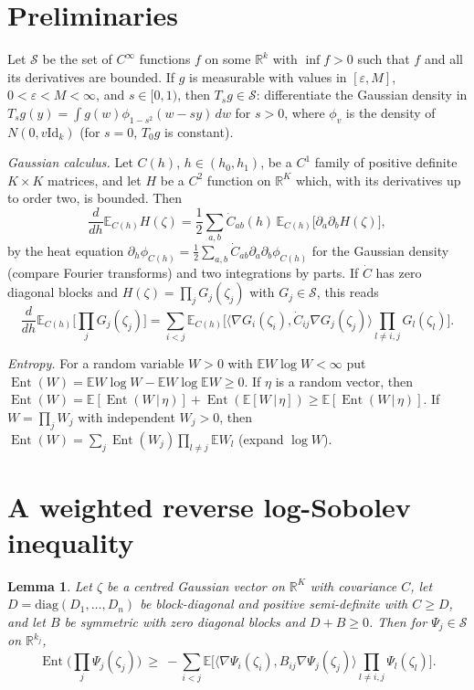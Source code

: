 \documentclass[11pt]{amsart}
\newtheorem{lemma}[theorem]{Lemma}
\theoremstyle{definition}
\newcommand{\E}{\mathbb{E}}
\newcommand{\R}{\mathbb{R}}
\newcommand{\Ent}{\operatorname{Ent}}
\newcommand{\cS}{\mathcal{S}}
\newcommand{\Id}{\mathrm{Id}}
\begin{document}
\section{Preliminaries}
Let $\cS$ be the set of $C^\infty$ functions $f$ on some $\R^k$ with $\inf f>0$ such that $f$ and all its derivatives
are bounded. If $g$ is measurable with values in $[\varepsilon,M]$, $0<\varepsilon<M<\infty$, and $s\in[0,1)$, then
$T_sg\in\cS$: differentiate the Gaussian density in $T_sg(y)=\int g(w)\phi_{1-s^2}(w-sy)\,dw$ for $s>0$, where
$\phi_v$ is the density of $N(0,v\Id_k)$ (for $s=0$, $T_0g$ is constant).

\emph{Gaussian calculus.} Let $C(h)$, $h\in(h_0,h_1)$, be a $C^1$ family of positive definite $K\times K$ matrices, and
let $H$ be a $C^2$ function on $\R^K$ which, with its derivatives up to order two, is bounded. Then
\begin{equation}\label{eq:interp}
\frac{d}{dh}\E_{C(h)}H(\zeta)=\frac12\sum_{a,b}\dot C_{ab}(h)\,\E_{C(h)}\big[\partial_a\partial_bH(\zeta)\big],
\end{equation}
by the heat equation $\partial_h\phi_{C(h)}=\frac12\sum_{a,b}\dot C_{ab}\partial_a\partial_b\phi_{C(h)}$ for the
Gaussian density (compare Fourier transforms) and two integrations by parts. If $\dot C$ has zero diagonal blocks and
$H(\zeta)=\prod_jG_j(\zeta_j)$ with $G_j\in\cS$, this reads
\begin{equation}\label{eq:drho}
\frac{d}{dh}\E_{C(h)}\Big[\prod_jG_j(\zeta_j)\Big]=\sum_{i<j}\E_{C(h)}\Big[\big\langle\nabla G_i(\zeta_i),
\dot C_{ij}\nabla G_j(\zeta_j)\big\rangle\prod_{l\ne i,j}G_l(\zeta_l)\Big].
\end{equation}

\emph{Entropy.} For a random variable $W>0$ with $\E W\log W<\infty$ put $\Ent(W)=\E W\log W-\E W\log\E W\ge0$. If
$\eta$ is a random vector, then $\Ent(W)=\E[\Ent(W\,|\,\eta)]+\Ent(\E[W\,|\,\eta])\ge\E[\Ent(W\,|\,\eta)]$. If
$W=\prod_jW_j$ with independent $W_j>0$, then $\Ent(W)=\sum_j\Ent(W_j)\prod_{l\ne j}\E W_l$ (expand $\log W$).

\section{A weighted reverse log-Sobolev inequality}
\begin{lemma}\label{lem:rlsi}
Let $\zeta$ be a centred Gaussian vector on $\R^K$ with covariance $C$, let $D=\mathrm{diag}(D_1,\dots,D_n)$ be
block-diagonal and positive semi-definite with $C\ge D$, and let $B$ be symmetric with zero diagonal blocks and
$D+B\ge0$. Then for $\Psi_j\in\cS$ on $\R^{k_j}$,
\begin{equation}\label{eq:rlsi}
\Ent\Big(\prod_j\Psi_j(\zeta_j)\Big)\ \ge\ -\sum_{i<j}\E\Big[\big\langle\nabla\Psi_i(\zeta_i),B_{ij}\nabla\Psi_j(\zeta_j)
\big\rangle\prod_{l\ne i,j}\Psi_l(\zeta_l)\Big].
\end{equation}
\end{lemma}
\end{document}
